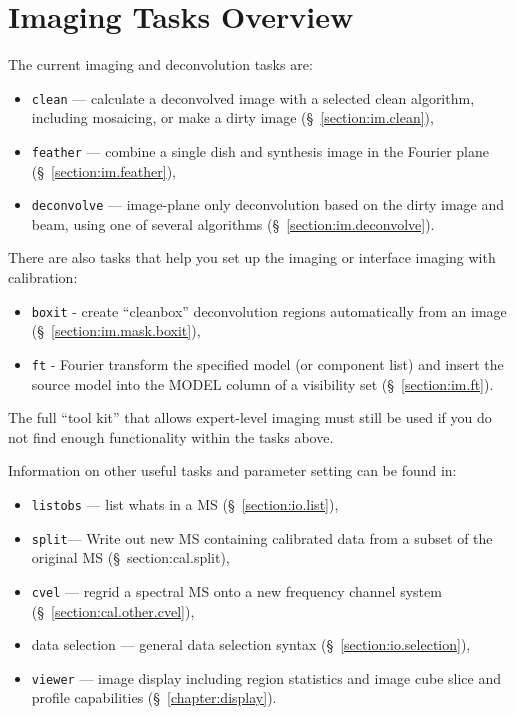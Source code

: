 \section{Imaging Tasks Overview}
\label{section:im.tasks}

The current imaging and deconvolution tasks are:
\begin{itemize}
   \item {\tt clean} --- calculate a deconvolved image with a selected clean
         algorithm, including mosaicing, or make a dirty image
         (\S~\ref{section:im.clean}),
   \item {\tt feather} --- combine a single dish and synthesis image in the
         Fourier plane (\S~\ref{section:im.feather}),
   \item {\tt deconvolve} --- image-plane only deconvolution based on
         the dirty image and beam, using one of several algorithms
         (\S~\ref{section:im.deconvolve}).
\end{itemize}

There are also tasks that help you set up the imaging or interface
imaging with calibration:

\begin{itemize}
   \item {\tt boxit} - create ``cleanbox'' deconvolution regions automatically
         from an image
	 (\S~\ref{section:im.mask.boxit}),
   \item {\tt ft} - Fourier transform the specified model (or component
         list) and insert the source model into the MODEL column of a
         visibility set (\S~\ref{section:im.ft}).
\end{itemize}

The full ``tool kit'' that allows expert-level imaging must still be
used if you do not find enough functionality within the tasks above. 

Information on other useful tasks and parameter setting can be found in:
\begin{itemize}
   \item {\tt listobs} --- list whats in a MS (\S~\ref{section:io.list}),
   \item {\tt split}--- Write out new MS containing calibrated data
      from a subset of the original MS (\S~{section:cal.split}),
   \item {\tt cvel} --- regrid a spectral MS onto a new frequency
      channel system
      (\S~\ref{section:cal.other.cvel}),
   \item data selection --- general data selection syntax
      (\S~\ref{section:io.selection}),
   \item {\tt viewer} --- image display including region statistics and
         image cube slice and profile capabilities
         (\S~\ref{chapter:display}).
\end{itemize}

